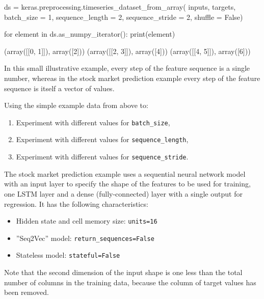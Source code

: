 \begin{withcode}
\begin{pythoncode}
ds = keras.preprocessing.timeseries_dataset_from_array(
     inputs, 
     targets,
     batch_size = 1, 
     sequence_length = 2, 
     sequence_stride = 2, 
     shuffle = False)
     
for element in ds.as_numpy_iterator():
     print(element)
\end{pythoncode}

\begin{textcode}
(array([[0, 1]]), array([2]))
(array([[2, 3]]), array([4]))
(array([[4, 5]]), array([6]))
\end{textcode}

In this small illustrative example, every step of the feature sequence is a single number, whereas in the stock market prediction example every step of the feature sequence is itself a vector of values.


\begin{exerciseboxcomputer}

Using the simple example data from above to:
\begin{enumerate}
   \item Experiment with different values for \texttt{batch\_size},
   \item Experiment with different values for \texttt{sequence\_length},
   \item Experiment with different values for \texttt{sequence\_stride}.
\end{enumerate}
\end{exerciseboxcomputer}

The stock market prediction example uses a sequential neural network model with an input layer to specify the shape of the features to be used for training, one LSTM layer and a dense (fully-connected) layer with a single output for regression. It has the following characteristics:

\begin{itemize}
   \item Hidden state and cell memory size: \texttt{units=16}
   \item ''Seq2Vec'' model: \texttt{return\_sequences=False}
   \item Stateless model: \texttt{stateful=False}
\end{itemize}

Note that the second dimension of the input shape is one less than the total number of columns in the training data, because the column of target values has been removed.


\end{withcode}
